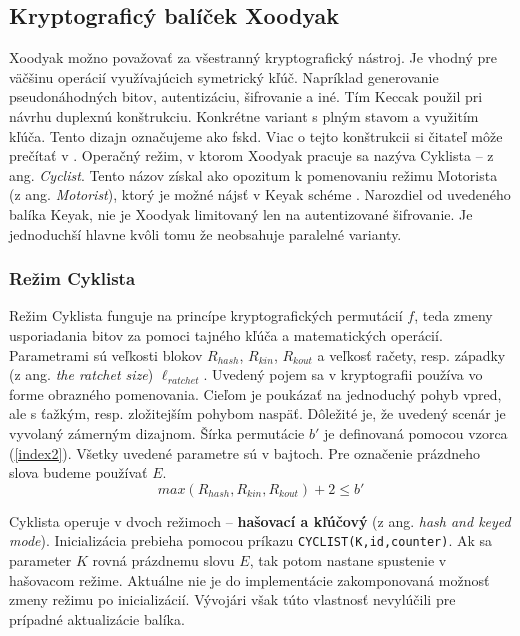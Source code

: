 \subsection{Kryptograficý balíček Xoodyak} 
Xoodyak možno považovať za všestranný kryptografický nástroj. Je vhodný pre väčšinu operácií využívajúcich symetrický kľúč. Napríklad generovanie pseudonáhodných bitov, autentizáciu, šifrovanie a iné. Tím Keccak použil pri návrhu duplexnú konštrukciu. Konkrétne variant s plným stavom a využitím kľúča. Tento dizajn označujeme ako \acrfull{fskd}. Viac o tejto konštrukcii si čitateľ môže prečítať v \cite{duplex}.
Operačný režim, v ktorom Xoodyak pracuje sa nazýva Cyklista -- z ang. \textit{Cyclist}. Tento názov získal ako opozitum k pomenovaniu režimu Motorista (z ang. \textit{Motorist}), ktorý je možné nájsť v Keyak schéme \cite{keyak}. Narozdiel od uvedeného balíka Keyak, nie je Xoodyak limitovaný len na autentizované šifrovanie. Je jednoduchší hlavne kvôli tomu že neobsahuje paralelné varianty.

\subsubsection{Režim Cyklista}\label{cyklista}
Režim Cyklista funguje na princípe kryptografických permutácií $f$, teda zmeny usporiadania bitov za pomoci tajného kľúča a matematických operácií. Parametrami sú veľkosti blokov $R_{hash}$, $R_{kin}$, $R_{kout}$ a veľkosť račety, resp. západky (z ang. \textit{the ratchet size}) \cite{ratchet} $\ell_{ratchet}$. Uvedený pojem sa v kryptografii používa vo forme obrazného pomenovania. Cieľom je poukázať na jednoduchý pohyb vpred, ale s ťažkým, resp. zložitejším pohybom naspäť. Dôležité je, že uvedený scenár je vyvolaný zámerným dizajnom. Šírka permutácie $b'$ je definovaná pomocou vzorca (\ref{index2}). Všetky uvedené parametre sú v bajtoch. Pre označenie prázdneho slova budeme používať $E$.
\begin{equation}\label{index2}
	max(R_{hash}, R_{kin}, R_{kout}) + 2 \leq b'
\end{equation} 

Cyklista operuje v dvoch režimoch -- \textbf{hašovací a kľúčový} (z ang. \textit{hash and keyed mode}). 
Inicializácia prebieha pomocou príkazu \lstinline|CYCLIST(K,id,counter)|. Ak sa parameter $K$ rovná prázdnemu slovu $E$, tak potom nastane spustenie v hašovacom režime. Aktuálne nie je do implementácie zakomponovaná možnosť zmeny režimu po inicializácií. Vývojári však túto vlastnosť nevylúčili pre prípadné aktualizácie balíka.  



